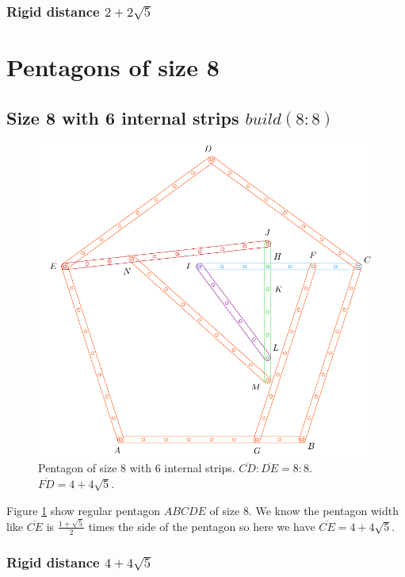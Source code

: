\documentclass[11pt]{article}
\begin{document}
\subsubsection{Rigid distance $2 + 2\sqrt5$}



\section{Pentagons of size 8}

\subsection{Size 8 with 6 internal strips $build(8:8)$}

\begin{figure}[H]
\centering
\includegraphics[scale=0.8]{8/penta8-6a}
\caption{Pentagon of size 8 with 6 internal strips. $\overline{CD} : \overline{DE} = 8:8$. $\overline{FD} = 4 + 4\sqrt5$.}
\label{fig:penta8-6a}
\end{figure}

Figure \ref{fig:penta8-6a} show regular pentagon $ABCDE$ of size 8. We know the pentagon width like $\overline{CE}$ is $\frac{1+\sqrt5}2$ times the side of the pentagon so here we have $\overline{CE} = 4+4\sqrt5$.

\subsubsection{Rigid distance $4 + 4\sqrt5$}
\end{document}
